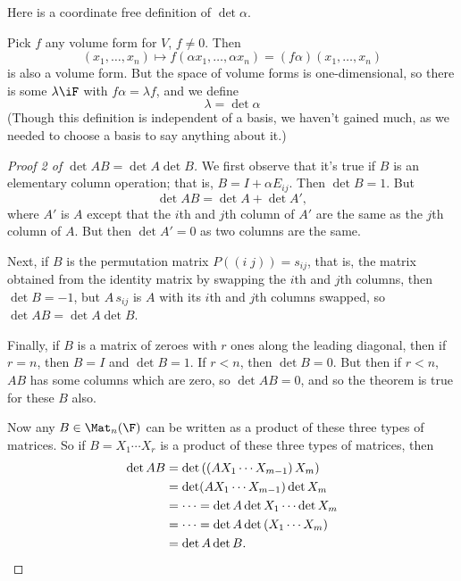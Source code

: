\begin{remark}
	Here is a coordinate free definition of $\det\alpha$. %
	
	Pick $f$ any volume form for $V$, $f\neq 0$. Then
	\begin{equation*}
		\left( x_1,\ldots,x_n \right) \mapsto f(\alpha x_1,\ldots,\alpha x_n) = (f\alpha)(x_1,\ldots,x_n) %
	\end{equation*}
	is also a volume form. But the space of volume forms is one-dimensional, so there is some $\lambda\iF$ with $f\alpha=\lambda f$, and we define %
	\begin{equation*}
		\lambda=\det\alpha
	\end{equation*}
	(Though this definition is independent of a basis, we haven't gained much, as we needed to choose a basis to say anything about it.) %
\end{remark}

\begin{proof}
	[Proof 2 of $\det AB=\det A \det B$] We first observe that it's true if $B$ is an elementary column operation; that is, $B=I+\alpha E_{ij}$. Then $\det B=1$. But %
	\begin{equation*}
		\det AB = \det A + \det A',
	\end{equation*}
	where $A'$ is $A$ except that the $i$th and $j$th column of $A'$ are the same as the $j$th column of $A$. But then $\det A'=0$ as two columns are the same. %
	
	Next, if $B$ is the permutation matrix $P((i\;j)) = s_{ij}$, that is, the matrix obtained from the identity matrix by swapping the $i$th and $j$th columns, then $\det B=-1$, but $A\,s_{ij}$ is $A$ with its $i$th and $j$th columns swapped, so $\det AB = \det A \det B$. %
	
	Finally, if $B$ is a matrix of zeroes with $r$ ones along the leading diagonal, then if $r=n$, then $B=I$ and $\det B=1$. If $r<n$, then $\det B=0$. But then if $r<n$, $AB$ has some columns which are zero, so $\det AB=0$, and so the theorem is true for these $B$ also. %
	
	Now any $B\in\Mat_n(\F)$ can be written as a product of these three types of matrices. So if $B=X_1 \cdots X_r$ is a product of these three types of matrices, then %
	\begin{align*}
		   \det AB
		&= \det \left(( AX_1 \cdots X_{m-1} \right) X_m ) \\
		&= \det (A X_1 \cdots X_{m-1}) \det X_m  \\
		&= \cdots
		 = \det A \det X_1 \cdots \det X_m \\
		&= \cdots = \det A \det \left( X_1 \cdots X_m \right) \\
		&= \det A \det B. \qedhere
	\end{align*}
\end{proof}

